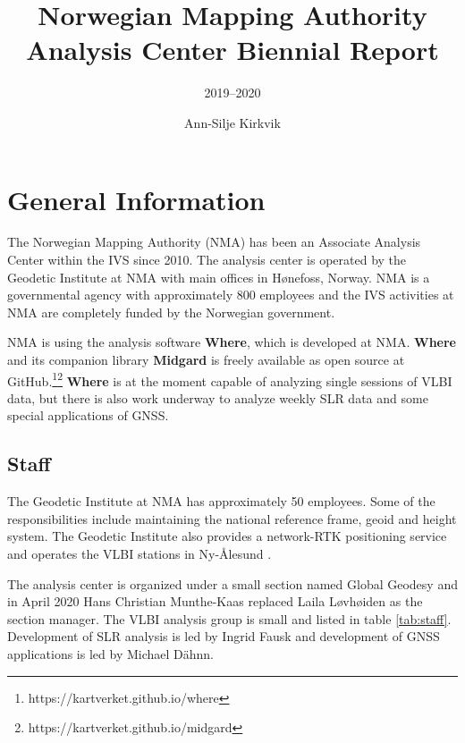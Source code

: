 \documentclass[twocolumn,twoside]{svmultivs_br} %
\title*{Norwegian Mapping Authority Analysis Center Biennial Report}
\subtitle{2019--2020}
\author{Ann-Silje Kirkvik}
\institute{Norwegian Mapping Authority (NMA)}
\begin{document}
\maketitle       %
\section{General Information}
The Norwegian Mapping Authority (NMA) has been an Associate Analysis Center
within the IVS since 2010. The analysis center is operated by the Geodetic
Institute at NMA with main offices in H\o nefoss, Norway. NMA is a governmental
agency with approximately 800 employees and the IVS activities at NMA are
completely funded by the Norwegian government.

NMA is using the analysis software \textbf{Where}, which is developed at NMA.
\textbf{Where}  and its companion library \textbf{Midgard} is
freely available as open source at GitHub.\footnote{https://kartverket.github.io/where}\footnote{https://kartverket.github.io/midgard}
\textbf{Where} is at the moment
capable of analyzing single sessions of VLBI data, but there is also work underway
to analyze weekly SLR data and some special applications of GNSS.

\subsection{Staff}
The Geodetic Institute at NMA has approximately 50 employees. Some of the responsibilities include maintaining the
national reference frame, geoid and height system. The Geodetic Institute also provides a network-RTK positioning
service and operates the VLBI stations in Ny-\AA lesund \cite{kupiszewski2021}.

The analysis center is organized under a small section named Global Geodesy and in April 2020 Hans Christian Munthe-Kaas
replaced Laila L\o vh\o iden as the section manager. The VLBI analysis group is small and listed in table \ref{tab:staff}.
Development of SLR analysis is led by Ingrid Fausk and development of GNSS applications is led by Michael D\"ahnn.
\end{document}
